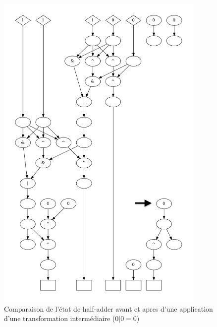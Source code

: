 \documentclass[a4paper,12pt]{article}
\begin{document}
\begin{figure}[H]
\begin{minipage}{0.49\textwidth}
            \includegraphics[width=0.9\textwidth]{figures/half_adder/debug_evualte_17-1.png}
        \end{minipage}
    \caption{Comparaison de l'état de half-adder avant et apres d'une application d'une transformation intermédiaire ($0 | 0 = 0$)}
    \label{fig:half-adder-comparaison}
\end{figure}
\end{document}
